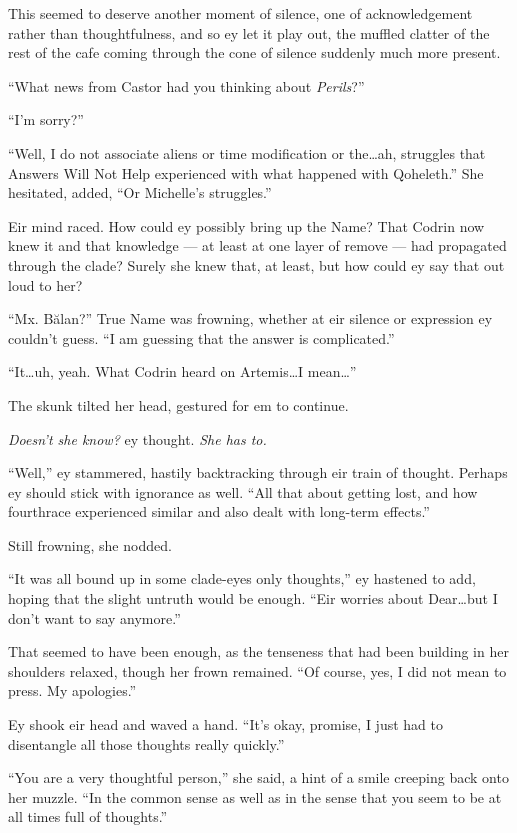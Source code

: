 This seemed to deserve another moment of silence, one of acknowledgement rather than thoughtfulness, and so ey let it play out, the muffled clatter of the rest of the cafe coming through the cone of silence suddenly much more present.

``What news from Castor had you thinking about \emph{Perils}?''

``I'm sorry?''

``Well, I do not associate aliens or time modification or the\ldots ah, struggles that Answers Will Not Help experienced with what happened with Qoheleth.'' She hesitated, added, ``Or Michelle's struggles.''

Eir mind raced. How could ey possibly bring up the Name? That Codrin now knew it and that knowledge — at least at one layer of remove — had propagated through the clade? Surely she knew that, at least, but how could ey say that out loud to her?

``Mx. Bălan?'' True Name was frowning, whether at eir silence or expression ey couldn't guess. ``I am guessing that the answer is complicated.''

``It\ldots uh, yeah. What Codrin heard on Artemis\ldots I mean\ldots{}''

The skunk tilted her head, gestured for em to continue.

\emph{Doesn't she know?} ey thought. \emph{She has to.}

``Well,'' ey stammered, hastily backtracking through eir train of thought. Perhaps ey should stick with ignorance as well. ``All that about getting lost, and how fourthrace experienced similar and also dealt with long-term effects.''

Still frowning, she nodded.

``It was all bound up in some clade-eyes only thoughts,'' ey hastened to add, hoping that the slight untruth would be enough. ``Eir worries about Dear\ldots but I don't want to say anymore.''

That seemed to have been enough, as the tenseness that had been building in her shoulders relaxed, though her frown remained. ``Of course, yes, I did not mean to press. My apologies.''

Ey shook eir head and waved a hand. ``It's okay, promise, I just had to disentangle all those thoughts really quickly.''

``You are a very thoughtful person,'' she said, a hint of a smile creeping back onto her muzzle. ``In the common sense as well as in the sense that you seem to be at all times full of thoughts.''

